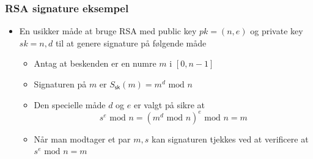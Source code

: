\documentclass[a4, english]{article}
\begin{document}
\subsubsection{RSA signature eksempel}
\begin{itemize}
	\item En usikker måde at bruge RSA med public key $pk=(n,e)$ og private key $sk = n,d$ til at genere signature på følgende måde
  \begin{itemize}
  	\item Antag at beskenden er en numre $m$ i $[0, n-1]$ 
    \item Signaturen på $m$ er $S_{\mathsf{sk}}(m) = m^d \text{ mod } n$
    \item Den specielle måde $d$ og $e$ er valgt på sikre at 
\begin{equation*}
  s^e \text{ mod } n = (m^d \text{ mod } n)^e \text{ mod } n = m 
\end{equation*}
    \item Når man modtager et par $m,s$ kan signaturen tjekkes ved at verificere at $s^e \text{ mod } n = m$
  \end{itemize}
\end{itemize}
\end{document}
